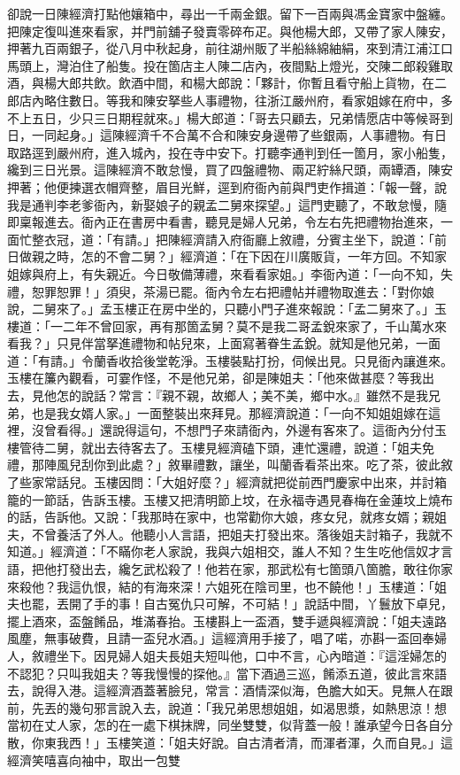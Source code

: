 \begin{showcontents}{}
卻說一日陳經濟打點他孃箱中，尋出一千兩金銀。留下一百兩與馮金寶家中盤纏。把陳定復叫進來看家，并門前舖子發賣零碎布疋。與他楊大郎，又帶了家人陳安，押著九百兩銀子，從八月中秋起身，前往湖州販了半船絲綿紬絹，來到清江浦江口馬頭上，灣泊住了船隻。投在箇店主人陳二店內，夜間點上燈光，交陳二郎殺雞取酒，與楊大郎共飲。飲酒中間，和楊大郎說：「夥計，你暫且看守船上貨物，在二郎店內略住數日。等我和陳安拏些人事禮物，往浙江嚴州府，看家姐嫁在府中，多不上五日，少只三日期程就來。」楊大郎道：「哥去只顧去，兄弟情愿店中等候哥到日，一同起身。」這陳經濟千不合萬不合和陳安身邊帶了些銀兩，人事禮物。有日取路逕到嚴州府，進入城內，投在寺中安下。打聽李通判到任一箇月，家小船隻，纔到三日光景。這陳經濟不敢怠慢，買了四盤禮物、兩疋紵絲尺頭，兩罈酒，陳安押著；他便揀選衣帽齊整，眉目光鮮，逕到府衙內前與門吏作揖道：「報一聲，說我是通判李老爹衙內，新娶娘子的親孟二舅來探望。」這門吏聽了，不敢怠慢，隨即稟報進去。衙內正在書房中看書，聽見是婦人兄弟，令左右先把禮物抬進來，一面忙整衣冠，道：「有請。」把陳經濟請入府衙廳上敘禮，分賓主坐下，說道：「前日做親之時，怎的不會二舅？」經濟道：「在下因在川廣販貨，一年方回。不知家姐嫁與府上，有失親近。今日敬備薄禮，來看看家姐。」李衙內道：「一向不知，失禮，恕罪恕罪！」須臾，茶湯已罷。衙內令左右把禮帖并禮物取進去：「對你娘說，二舅來了。」孟玉樓正在房中坐的，只聽小門子進來報說：「孟二舅來了。」玉樓道：「一二年不曾回家，再有那箇孟舅？莫不是我二哥孟銳來家了，千山萬水來看我？」只見伴當拏進禮物和帖兒來，上面寫著眷生孟銳。就知是他兄弟，一面道：「有請。」令蘭香收拾後堂乾淨。玉樓裝點打扮，伺候出見。只見衙內讓進來。玉樓在簾內觀看，可霎作怪，不是他兄弟，卻是陳姐夫：「他來做甚麼？等我出去，見他怎的說話？常言：『親不親，故鄉人；美不美，鄉中水。』雖然不是我兄弟，也是我女婿人家。」一面整裝出來拜見。那經濟說道：「一向不知姐姐嫁在這裡，沒曾看得。」還說得這句，不想門子來請衙內，外邊有客來了。這衙內分付玉樓管待二舅，就出去待客去了。玉樓見經濟磕下頭，連忙還禮，說道：「姐夫免禮，那陣風兒刮你到此處？」敘畢禮數，讓坐，叫蘭香看茶出來。吃了茶，彼此敘了些家常話兒。玉樓因問：「大姐好麼？」經濟就把從前西門慶家中出來，并討箱籠的一節話，告訴玉樓。玉樓又把清明節上坟，在永福寺遇見春梅在金蓮坟上燒布的話，告訴他。又說：「我那時在家中，也常勸你大娘，疼女兒，就疼女婿；親姐夫，不曾養活了外人。他聽小人言語，把姐夫打發出來。落後姐夫討箱子，我就不知道。」經濟道：「不瞞你老人家說，我與六姐相交，誰人不知？生生吃他信奴才言語，把他打發出去，纔乞武松殺了！他若在家，那武松有七箇頭八箇膽，敢往你家來殺他？我這仇恨，結的有海來深！六姐死在陰司里，也不饒他！」玉樓道：「姐夫也罷，丟開了手的事！自古冤仇只可解，不可結！」說話中間，丫鬟放下卓兒，擺上酒來，盃盤餚品，堆滿春抬。玉樓斟上一盃酒，雙手遞與經濟說：「姐夫遠路風塵，無事破費，且請一盃兒水酒。」這經濟用手接了，唱了喏，亦斟一盃回奉婦人，敘禮坐下。因見婦人姐夫長姐夫短叫他，口中不言，心內暗道：『這淫婦怎的不認犯？只叫我姐夫？等我慢慢的探他。』當下酒過三巡，餚添五道，彼此言來語去，說得入港。這經濟酒蓋著臉兒，常言：酒情深似海，色膽大如天。見無人在跟前，先丟的幾句邪言說入去，說道：「我兄弟思想姐姐，如渴思漿，如熱思涼！想當初在丈人家，怎的在一處下棋抹牌，同坐雙雙，似背蓋一般！誰承望今日各自分散，你東我西！」玉樓笑道：「姐夫好說。自古清者清，而渾者渾，久而自見。」這經濟笑嘻喜向袖中，取出一包雙
\end{showcontents}

